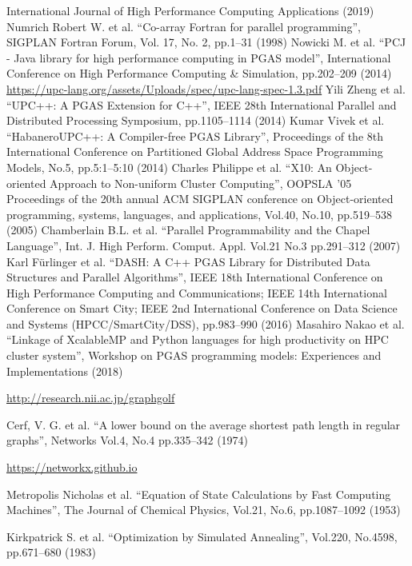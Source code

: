 \begin{thebibliography}{99.}
  International Journal of High Performance Computing Applications (2019)
%
 Numrich Robert W. et al.
``Co-array Fortran for parallel programming'',
SIGPLAN Fortran Forum, Vol. 17, No. 2, pp.1--31 (1998)
%
 Nowicki M. et al.
  ``PCJ - Java library for high performance computing in PGAS model'',
   International Conference on High Performance Computing \& Simulation, pp.202--209 (2014)
%
 \url{https://upc-lang.org/assets/Uploads/spec/upc-lang-spec-1.3.pdf}
%
 Yili Zheng et al.
  ``UPC++: A PGAS Extension for C++'',  IEEE 28th International Parallel and Distributed Processing Symposium, pp.1105--1114 (2014)
%
 Kumar Vivek et al.
``HabaneroUPC++: A Compiler-free PGAS Library'', 
  Proceedings of the 8th International Conference on Partitioned Global Address Space Programming Models,
  No.5, pp.5:1--5:10 (2014)
%
 Charles Philippe et al.
``X10: An Object-oriented Approach to Non-uniform Cluster Computing'',
OOPSLA '05 Proceedings of the 20th annual ACM SIGPLAN conference on Object-oriented programming, systems, languages, and applications, Vol.40, No.10, pp.519--538 (2005)
%
 Chamberlain B.L. et al.
``Parallel Programmability and the Chapel Language'',
Int. J. High Perform. Comput. Appl. Vol.21 No.3 pp.291--312 (2007)
%
 Karl F{\"{u}}rlinger et al.
``DASH: A C++ PGAS Library for Distributed Data Structures and Parallel Algorithms'',
  IEEE 18th International Conference on High Performance Computing and Communications; IEEE 14th International Conference on Smart City; IEEE 2nd International Conference on Data Science and Systems (HPCC/SmartCity/DSS), pp.983--990 (2016)
%
 Masahiro Nakao et al.
``Linkage of XcalableMP and Python languages for high productivity on HPC cluster system'',
  Workshop on PGAS programming models: Experiences and Implementations (2018)

 \url{http://research.nii.ac.jp/graphgolf}

 Cerf, V. G. et al.
``A lower bound on the average shortest path length in regular graphs'',
Networks Vol.4, No.4 pp.335--342 (1974)

 \url{https://networkx.github.io}

 Metropolis Nicholas et al.
``Equation of State Calculations by Fast Computing Machines'',
The Journal of Chemical Physics, Vol.21, No.6, pp.1087--1092 (1953)

 Kirkpatrick S. et	al.
``Optimization by Simulated Annealing'', Vol.220, No.4598, pp.671--680 (1983)

\end{thebibliography}
